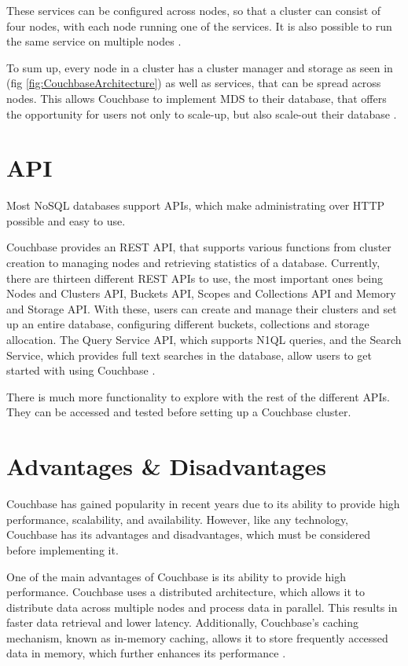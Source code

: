 These services can be configured across nodes, so that a cluster can consist of four nodes, with each node running one of the services. It is also possible to run the same service on multiple nodes \parencite{CouchbaseIntroduction}.

To sum up, every node in a cluster has a cluster manager and storage as seen in (fig \ref{fig:CouchbaseArchitecture}) as well as services, that can be spread across nodes. This allows Couchbase to implement \ac{MDS} to their database, that offers the opportunity for users not only to scale-up, but also scale-out their database \parencite{CouchbasePaper}.

\section{API}

Most \ac{NoSQL} databases support \acp{API}, which make administrating over \ac{HTTP} possible and easy to use.

Couchbase provides an \ac{REST} \ac{API}, that supports various functions from cluster creation to managing nodes and retrieving statistics of a database. Currently, there are thirteen different \ac{REST} \acp{API} to use, the most important ones being Nodes and Clusters \ac{API}, Buckets \ac{API}, Scopes and Collections \ac{API} and Memory and Storage \ac{API}. With these, users can create and manage their clusters and set up an entire database, configuring different buckets, collections and storage allocation. The Query Service \ac{API}, which supports \ac{N1QL} queries, and the Search Service, which provides full text searches in the database, allow users to get started with using Couchbase \parencite{CouchbaseAPI}.

There is much more functionality to explore with the rest of the different \acp{API}. They can be accessed and tested before setting up a Couchbase cluster.

\section{Advantages \& Disadvantages}

Couchbase has gained popularity in recent years due to its ability to provide high performance, scalability, and availability. However, like any technology, Couchbase has its advantages and disadvantages, which must be considered before implementing it.

One of the main advantages of Couchbase is its ability to provide high performance. Couchbase uses a distributed architecture, which allows it to distribute data across multiple nodes and process data in parallel. This results in faster data retrieval and lower latency. Additionally, Couchbase's caching mechanism, known as in-memory caching, allows it to store frequently accessed data in memory, which further enhances its performance \parencite{Couchbase.20230414, Couchbase.Review, CouchbaseArchitecturalAdvantages}.

